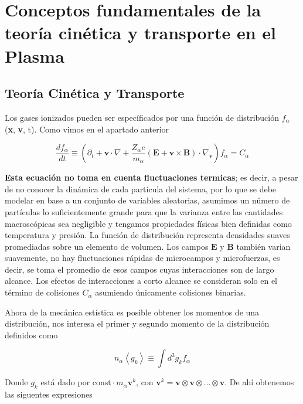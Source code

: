 \section{Conceptos fundamentales de la teor\'ia cin\'etica y transporte en el Plasma}



\subsection{Teor\'ia Cin\'etica y Transporte}

Los gases ionizados pueden ser espec\'ificados por una funci\'on de distribuci\'on $f_\alpha$(\textbf{x}, \textbf{v}, t). Como vimos en el apartado anterior

  \begin{equation}\label{eq:k}
    \frac{df_\alpha}{dt} \equiv \left(\partial_t + \textbf{v}\cdot\nabla + \frac{Z_\alpha e}{m_\alpha}(\textbf{E} + \textbf{v}\times\textbf{B})\cdot \nabla_\textbf{v} \right)f_\alpha = C_\alpha
  \end{equation}

  \textbf{Esta ecuaci\'on no toma en cuenta fluctuaciones termicas}; es decir, a pesar de no conocer la din\'amica de cada part\'icula del sistema, por lo que se debe modelar en base a un conjunto de variables aleatorias, asumimos un n\'umero de part\'iculas lo suficientemente grande para que la varianza entre las cantidades macrosc\'opicas sea negligible y tengamos propiedades f\'isicas bien definidas como temperatura y presi\'on. La funci\'on de distribuci\'on representa densidades suaves promediadas sobre un elemento de volumen. Los campos $\textbf{E}$ y $\textbf{B}$ tambi\'en varian suavemente, no hay fluctuaciones r\'apidas de microcampos y microfuerzas, es decir, se toma el promedio de esos campos cuyas interacciones son de largo alcance. Los efectos de interacciones a corto alcance se consideran solo en el t\'ermino de colisiones $C_\alpha$ asumiendo \'unicamente colisiones binarias.

  Ahora de la mec\'anica est\'istica es posible obtener los momentos de una distribuci\'on, nos interesa el primer y segundo momento\cite{helander2005} de la distribuci\'on definidos como 

  \begin{equation}
    n_\alpha\left<g_k\right> \equiv \int d^3 g_k f_\alpha
  \end{equation}

  Donde $g_k$ est\'a dado por $\text{const} \cdot m_\alpha\textbf{v}^k$, con $\textbf{v}^k = \textbf{v}\otimes\textbf{v}\otimes\dots\otimes\textbf{v}$. De ah\'i obtenemos las siguentes expresiones 

